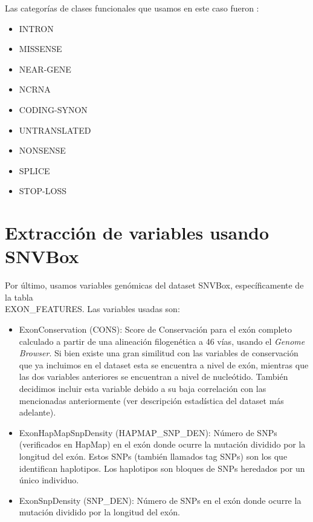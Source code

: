Las categorías de clases funcionales que usamos en este caso fueron \cite{tablefuncclasses}:
 
\begin{itemize}
    \setlength\itemsep{0em}
    \item INTRON
    \item MISSENSE
    \item NEAR-GENE
    \item NCRNA
    \item CODING-SYNON
    \item UNTRANSLATED
    \item NONSENSE
    \item SPLICE
    \item STOP-LOSS
\end{itemize}

\section{Extracción de variables usando SNVBox}

Por último, usamos variables genómicas del dataset SNVBox, específicamente de la tabla \\ EXON\_FEATURES. Las variables usadas son:
\begin{itemize}
    \item ExonConservation (CONS): Score de Conservación para el exón completo calculado a partir de una alineación filogenética a 46 vías, usando el \textit{Genome Browser}. Si bien existe una gran similitud con las variables de conservación que ya incluimos en el dataset esta se encuentra a nivel de exón, mientras que las dos variables anteriores se encuentran a nivel de nucleótido. También decidimos incluir esta variable debido a su baja correlación con las mencionadas anteriormente (ver descripción estadística del dataset más adelante).
    \item ExonHapMapSnpDensity (HAPMAP\_SNP\_DEN): Número de SNPs (verificados en HapMap) en el exón donde ocurre la mutación dividido por la longitud del exón. Estos SNPs (también llamados tag SNPs) son los que identifican haplotipos. Los haplotipos son bloques de SNPs heredados por un único individuo.
    \item ExonSnpDensity (SNP\_DEN): Número de SNPs en el exón donde ocurre la mutación dividido por la longitud del exón.
\end{itemize}

